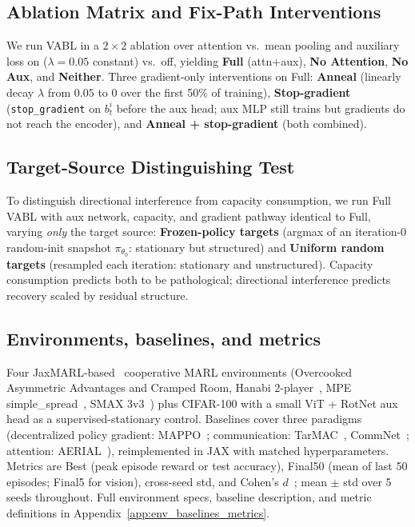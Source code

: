 \documentclass{article}
\theoremstyle{plain}
\theoremstyle{definition}
\theoremstyle{remark}
\begin{document}
\subsection{Ablation Matrix and Fix-Path Interventions}
We run VABL in a $2 \times 2$ ablation over attention vs.\ mean
pooling and auxiliary loss on ($\lambda = 0.05$ constant) vs.\ off,
yielding \textbf{Full} (attn+aux), \textbf{No Attention}, \textbf{No
Aux}, and \textbf{Neither}. Three gradient-only interventions on
Full: \textbf{Anneal} (linearly decay $\lambda$ from $0.05$ to $0$
over the first 50\% of training), \textbf{Stop-gradient}
(\texttt{stop\_gradient} on $b_t^i$ before the aux head; aux MLP
still trains but gradients do not reach the encoder), and
\textbf{Anneal + stop-gradient} (both combined).

\subsection{Target-Source Distinguishing Test}
\label{sec:method_distinguishing}

To distinguish directional interference from capacity consumption,
we run Full VABL with aux network, capacity, and gradient pathway
identical to Full, varying \emph{only} the target source:
\textbf{Frozen-policy targets} (argmax of an iteration-0 random-init
snapshot $\pi_{\theta_0}$: stationary but structured) and
\textbf{Uniform random targets} (resampled each iteration: stationary
and unstructured). Capacity consumption predicts both to be
pathological; directional interference predicts recovery scaled by
residual structure.

\subsection{Environments, baselines, and metrics}
Four JaxMARL-based~\cite{rutherford2024jaxmarl} cooperative MARL
environments (Overcooked~\cite{carroll2019utility} Asymmetric
Advantages and Cramped Room, Hanabi 2-player~\cite{bard2020hanabi},
MPE simple\_spread~\cite{lowe2017multi}, SMAX
3v3~\cite{samvelyan2019starcraft,ellis2023smacv2}) plus CIFAR-100
with a small ViT + RotNet aux head as a supervised-stationary
control. Baselines cover three paradigms (decentralized policy
gradient: MAPPO~\cite{yu2022surprising}; communication:
TarMAC~\cite{das2019tarmac}, CommNet~\cite{sukhbaatar2016commnet};
attention: AERIAL~\cite{phan2023attention}), reimplemented in JAX
with matched hyperparameters. Metrics are Best (peak episode
reward or test accuracy), Final50 (mean of last 50 episodes;
Final5 for vision), cross-seed std, and Cohen's
$d$~\cite{cohen1988statistical}; mean $\pm$ std over 5 seeds
throughout. Full environment specs, baseline description, and
metric definitions in Appendix~\ref{app:env_baselines_metrics}.
\end{document}
